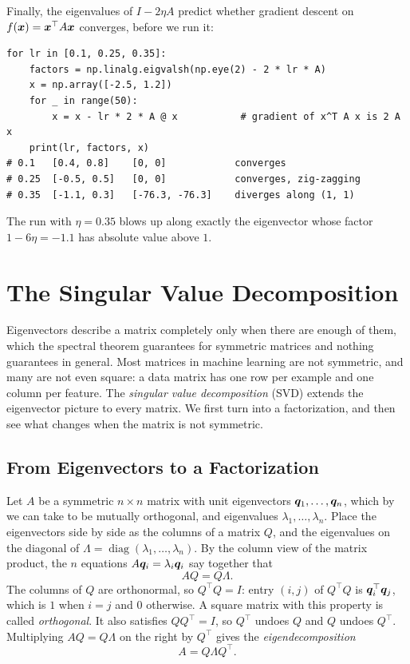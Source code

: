 Finally, the eigenvalues of $I - 2\eta A$ predict whether gradient
descent on $f(\bm{x}) = \bm{x}^\top A \bm{x}$ converges, before we
run it:

\begin{lstlisting}
for lr in [0.1, 0.25, 0.35]:
    factors = np.linalg.eigvalsh(np.eye(2) - 2 * lr * A)
    x = np.array([-2.5, 1.2])
    for _ in range(50):
        x = x - lr * 2 * A @ x           # gradient of x^T A x is 2 A x
    print(lr, factors, x)
# 0.1   [0.4, 0.8]    [0, 0]            converges
# 0.25  [-0.5, 0.5]   [0, 0]            converges, zig-zagging
# 0.35  [-1.1, 0.3]   [-76.3, -76.3]    diverges along (1, 1)
\end{lstlisting}

The run with $\eta = 0.35$ blows up along exactly the eigenvector whose
factor $1 - 6\eta = -1.1$ has absolute value above $1$.

\section{The Singular Value Decomposition}
\label{sec:ch04-svd}

Eigenvectors describe a matrix completely only when there are enough of
them, which the spectral theorem guarantees for symmetric matrices and
nothing guarantees in general. Most matrices in machine learning are not
symmetric, and many are not even square: a data matrix has one row per
example and one column per feature. The \emph{singular value
decomposition} (SVD) extends the eigenvector picture to every matrix. We
first turn  into a factorization, and then see what
changes when the matrix is not symmetric.

\subsection{From Eigenvectors to a Factorization}
\label{sec:ch04-eigendecomposition}

Let $A$ be a symmetric $n \times n$ matrix with unit eigenvectors
$\bm{q}_1, \dots, \bm{q}_n$, which by  we can take
to be mutually orthogonal, and eigenvalues $\lambda_1, \dots, \lambda_n$.
Place the eigenvectors side by side as the columns of a matrix $Q$, and
the eigenvalues on the diagonal of $\Lambda =
\operatorname{diag}(\lambda_1, \dots, \lambda_n)$. By the column view of
the matrix product, the $n$ equations $A\bm{q}_i = \lambda_i \bm{q}_i$
say together that
\[
  AQ = Q\Lambda .
\]
The columns of $Q$ are orthonormal, so $Q^\top Q = I$: entry $(i, j)$ of
$Q^\top Q$ is $\bm{q}_i^\top \bm{q}_j$, which is $1$ when $i = j$ and
$0$ otherwise. A square matrix with this property is called
\emph{orthogonal}. It also satisfies $QQ^\top = I$, so $Q^\top$ undoes
$Q$ and $Q$ undoes $Q^\top$. Multiplying $AQ = Q\Lambda$ on the right by
$Q^\top$ gives the \emph{eigendecomposition}
\begin{equation}
  A = Q \Lambda Q^\top .
  \label{eq:ch04-eigendecomposition}
\end{equation}

